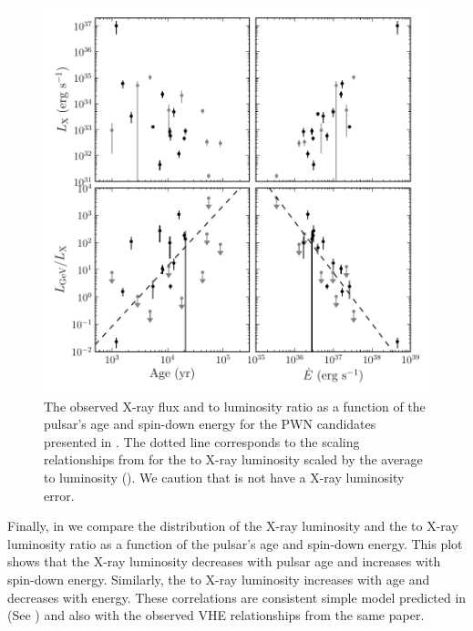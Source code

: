 \begin{figure}[htbp]
  \centering
  \includegraphics{chapters/population_study/figures/pwn_age_edot_vs_l_xray.pdf}
  \caption{The observed X-ray flux and \gev to \tev luminosity ratio as
  a function of the pulsar's age and spin-down energy for the \ac{PWN}
  candidates presented in .
  The dotted line corresponds to the scaling relationships from
  \cite{mattana_2009_evolution-gamma-} for the \tev to X-ray luminosity
  scaled by the average \gev to \tev luminosity (\MeanLuminosityRatio).
  We caution that \threecfiftyeight is not have a X-ray luminosity error.}
\end{figure}

Finally, in  we compare the distribution
of the X-ray luminosity and the \gev to X-ray luminosity ratio as a
function of the pulsar's age and spin-down energy.  This plot shows
that the X-ray luminosity decreases with pulsar age and increases with
spin-down energy. Similarly, the \gev to X-ray luminosity increases
with age and decreases with energy.  These correlations are consistent
simple model predicted in \cite{mattana_2009_evolution-gamma-} (See
) and also with the observed \ac{VHE} relationships
from the same paper.

